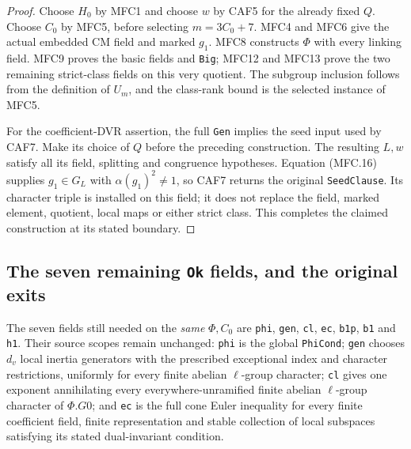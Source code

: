 \begin{proof}
Choose \(H_0\) by MFC1 and choose \(w\) by CAF5 for the
already fixed \(Q\).  Choose \(C_0\) by MFC5, before
selecting \(m=3C_0+7\).  MFC4 and MFC6 give the actual
embedded CM field and marked \(g_1\).  MFC8 constructs
\(\Phi\) with every linking field.  MFC9 proves the basic
fields and \texttt{Big}; MFC12 and MFC13 prove the two
remaining strict-class fields on this very quotient.
The subgroup inclusion follows from the definition of \(U_m\),
and the class-rank bound is the selected instance of MFC5.

For the coefficient-DVR assertion, the full \texttt{Gen}
implies the seed input used by CAF7.  Make its choice of
\(Q\) before the preceding construction.  The resulting
\(L,w\) satisfy all its field, splitting and congruence
hypotheses.  Equation (MFC.16) supplies
\(g_1\in G_L\) with \(\alpha(g_1)^2\ne1\), so CAF7
returns the original \texttt{SeedClause}.  Its character
triple is installed on this field; it does not replace the
field, marked element, quotient, local maps or either strict class.
This completes the claimed construction at its stated boundary.
\end{proof}

\subsection{The seven remaining \texttt{Ok} fields, and the original exits}

The seven fields still needed on the \emph{same} \(\Phi,C_0\)
are \texttt{phi}, \texttt{gen}, \texttt{cl}, \texttt{ec},
\texttt{b1p}, \texttt{b1} and \texttt{h1}.
Their source scopes remain unchanged: \texttt{phi} is the
global \texttt{PhiCond}; \texttt{gen} chooses \(d_v\) local
inertia generators with the prescribed exceptional index and
character restrictions, uniformly for every finite abelian
\(\ell\)-group character; \texttt{cl} gives one exponent
annihilating every everywhere-unramified finite abelian
\(\ell\)-group character of \(\Phi.G0\); and \texttt{ec}
is the full cone Euler inequality for every finite coefficient
field, finite representation and stable collection of local
subspaces satisfying its stated dual-invariant condition.

